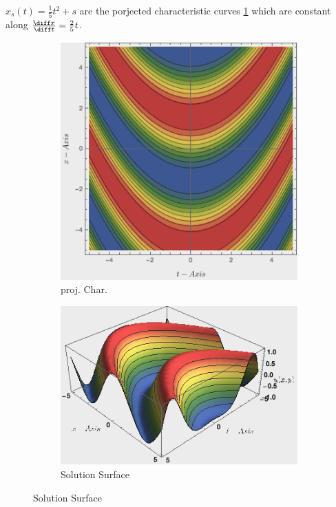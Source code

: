 \begin{notebox}[Note]
    $x_s(t)=\frac{1}{5}t^2+s$ are the porjected characteristic curves \cref{fig:projChar2p1} which are constant along $\frac{\diff x}{\diff t}=\frac{2}{5}t$.
                \begin{figure}[H]
                    \centering
                    \begin{subfigure}{.4\columnwidth}
                      \centering
                      \includegraphics[width=\linewidth]{src/method_of_characteristics/figures/projChar2p1.png}
                      \caption{proj. Char.}
                      \label{fig:projChar2p1}
                    \end{subfigure}%
                    \begin{subfigure}{.6\columnwidth}
                      \centering\tabularnewline
                      \includegraphics[width=\linewidth]{src/method_of_characteristics/figures/projChar2p2.png}
                      \caption{Solution Surface}
                      \label{fig:projChar2p2}
                    \end{subfigure}
                \end{figure}
\end{notebox}
